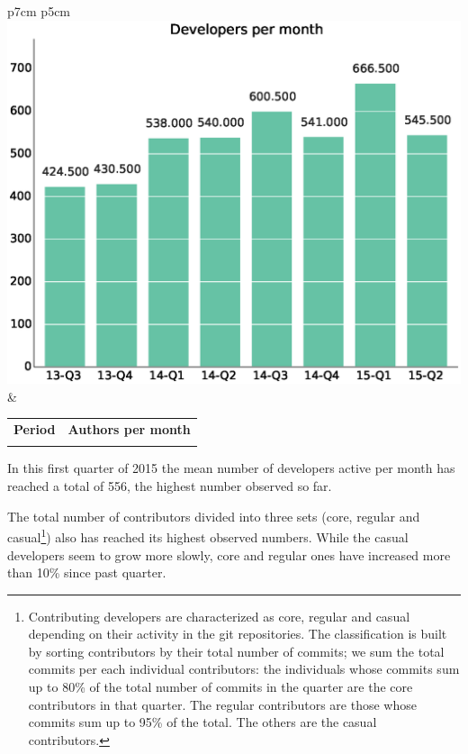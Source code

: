 \documentclass[a4wide,11pt]{report}
\begin{document}



\begin{tabular}{p{7cm} p{5cm}}
    \vspace{0pt} 
    \includegraphics[scale=.35]{figs/authors_month.eps}
    & 
    \vspace{0pt}
    \begin{tabular}{l|r|}%
    \bfseries Period & \bfseries Authors per month%
   \csvreader[head to column names]{data/authors_month.csv}{}%
   {\\ & \authormonth}
   \end{tabular}
\end{tabular}

In this first quarter of 2015 the mean number of developers active per
month has reached a total of 556, the highest number observed so far.

The total number of contributors divided into three sets (core,
regular and casual\footnote{Contributing developers are characterized
as core, regular and casual depending on their activity in the git
repositories. The classification is built by sorting contributors by
their total number of commits; we sum the total commits per each
individual contributors: the individuals whose commits sum up to 80\%
of the total number of commits in the quarter are the core
contributors in that quarter. The regular contributors are those whose
commits sum up to 95\% of the total. The others are the casual
contributors.}) also has reached its highest observed numbers. While
the casual developers seem to grow more slowly, core and regular ones
have increased more than 10\% since past quarter.
\end{document}
